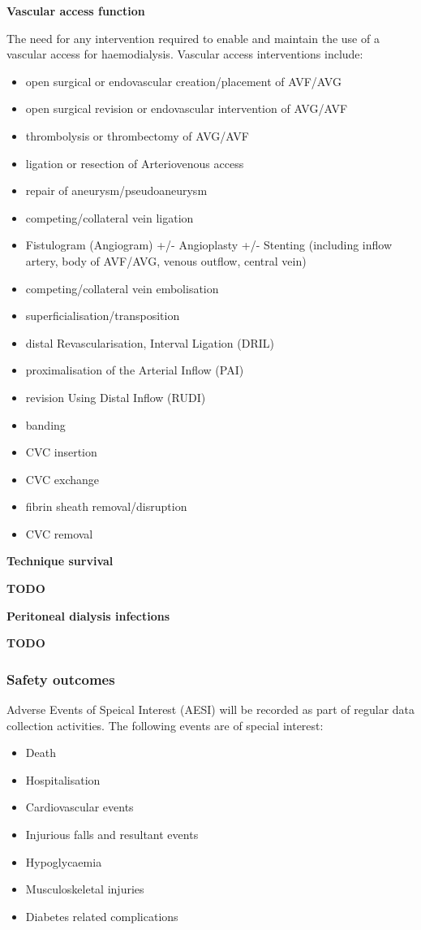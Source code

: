 \documentclass[11pt,parskip=half-]{scrartcl}
\providecommand{\tightlist}{%
  \setlength{\itemsep}{0pt}\setlength{\parskip}{0pt}}
\begin{document}
\textbf{Vascular access function}\label{vaf}

The need for any intervention required to enable and maintain the use of a vascular access for haemodialysis. Vascular access interventions include:
\begin{itemize}\tightlist
  \item open surgical or endovascular creation/placement of AVF/AVG
  \item open surgical revision or endovascular intervention of AVG/AVF
  \item thrombolysis or thrombectomy of AVG/AVF
  \item ligation or resection of Arteriovenous access
  \item repair of aneurysm/pseudoaneurysm
  \item competing/collateral vein ligation
  \item Fistulogram (Angiogram) +/- Angioplasty +/- Stenting (including inflow artery, body of AVF/AVG, venous outflow, central vein)
  \item competing/collateral vein embolisation
  \item superficialisation/transposition
  \item distal Revascularisation, Interval Ligation (DRIL)
  \item proximalisation of the Arterial Inflow (PAI)
  \item revision Using Distal Inflow (RUDI)
  \item banding
  \item CVC insertion
  \item CVC exchange
  \item fibrin sheath removal/disruption
  \item CVC removal
\end{itemize}

\textbf{Technique survival}

\textbf{TODO}

\textbf{Peritoneal dialysis infections}

\textbf{TODO}

\subsubsection{Safety outcomes}\label{safety-outcomes}

Adverse Events of Speical Interest (AESI) will be recorded as part of regular data collection activities. The following events are of special interest:
\begin{itemize}\tightlist
  \item Death
  \item Hospitalisation
  \item Cardiovascular events
  \item Injurious falls and resultant events
  \item Hypoglycaemia
  \item Musculoskeletal injuries
  \item Diabetes related complications
\end{itemize}
\end{document}
